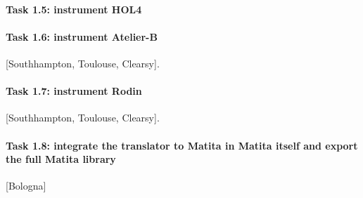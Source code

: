 

\paragraph{Task 1.5: instrument HOL4}



\paragraph{Task 1.6: instrument Atelier-B}

[Southhampton, Toulouse, Clearsy].

\paragraph{Task 1.7: instrument Rodin}

[Southhampton, Toulouse, Clearsy].

\paragraph{Task 1.8: integrate the translator to Matita in Matita itself and export the full Matita library}

[Bologna]

